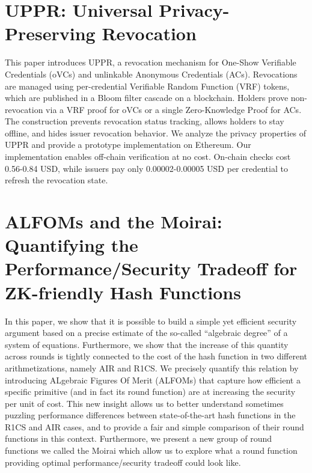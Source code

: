 \documentclass[11pt,oneside]{book}
\theoremstyle{definition}
\theoremstyle{remark}
\theoremstyle{plain}
\begin{document}
\section{\cite{cryptoeprint:2025/1919} UPPR: Universal Privacy-Preserving Revocation}
This paper introduces UPPR, a revocation mechanism for One-Show Verifiable Credentials (oVCs) and unlinkable Anonymous Credentials (ACs). Revocations are managed using per-credential Verifiable Random Function (VRF) tokens, which are published in a Bloom filter cascade on a blockchain. Holders prove non-revocation via a VRF proof for oVCs or a single Zero-Knowledge Proof for ACs. The construction prevents revocation status tracking, allows holders to stay offline, and hides issuer revocation behavior. We analyze the privacy properties of UPPR and provide a prototype implementation on Ethereum. Our implementation enables off-chain verification at no cost. On-chain checks cost 0.56-0.84 USD, while issuers pay only 0.00002-0.00005 USD per credential to refresh the revocation state.

\section{\cite{cryptoeprint:2025/1920} ALFOMs and the Moirai: Quantifying the Performance/Security Tradeoff for ZK-friendly Hash Functions}
In this paper, we show that it is possible to build a simple yet efficient security argument based on a precise estimate of the so-called “algebraic degree” of a system of equations. Furthermore, we show that the increase of this quantity across rounds is tightly connected to the cost of the hash function in two different arithmetizations, namely AIR and R1CS. We precisely quantify this relation by introducing ALgebraic Figures Of Merit (ALFOMs) that capture how efficient a specific primitive (and in fact its round function) are at increasing the security per unit of cost. This new insight allows us to better understand sometimes puzzling performance differences between state-of-the-art hash functions in the R1CS and AIR cases, and to provide a fair and simple comparison of their round functions in this context. Furthermore, we present a new group of round functions we called the Moirai which allow us to explore what a round function providing optimal performance/security tradeoff could look like.
\end{document}
